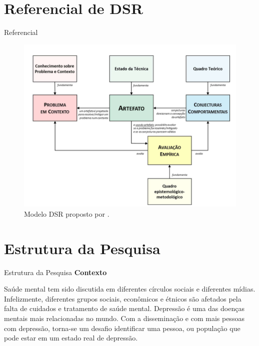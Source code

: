 \documentclass[aspectratio=169,10pt,xcolor={dvipsnames}]{beamer}
\begin{document}
\section{Referencial de DSR}
\begin{frame}{Referencial}
  \begin{figure}
    \centering
    \includegraphics[scale=.25]{Graphics/Pimentel_DSR_Model.png}
    \caption{Modelo DSR proposto por \cite{Pimentel2020}.}
  \end{figure}
\end{frame}

\section{Estrutura da Pesquisa}
\begin{frame}{Estrutura da Pesquisa}{}
  \textbf{\large Contexto}

  \begin{block}{}
    Saúde mental tem sido discutida em diferentes círculos sociais e diferentes mídias. Infelizmente, diferentes grupos sociais, econômicos e étnicos são afetados pela falta de cuidados e tratamento de saúde mental. Depressão é uma das doenças mentais mais relacionadas no mundo. Com a disseminação e com mais pessoas com depressão, torna-se um desafio identificar uma pessoa, ou população que pode estar em um estado real de depressão.
  \end{block}
\end{frame}
\end{document}
